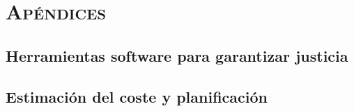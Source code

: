 \documentclass[oneside,openright,titlepage,numbers=noenddot,openany,headinclude,footinclude=true,
cleardoublepage=empty,abstractoff,BCOR=5mm,paper=a4,fontsize=12pt,main=spanish]{scrreprt}
\begin{document}

\ctparttext{\color{black}\begin{center}
\end{center}}
\part*{\textsc{Apéndices}}

\appendix
\chapter{Herramientas software para garantizar justicia}\label{ap:herr_just}


\chapter{Estimación del coste y planificación}\label{ap:coste_plan}




\end{document}

